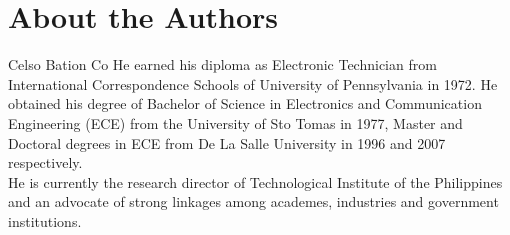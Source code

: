 \documentclass[10pt,journal,compsoc]{IEEEtran} \ifCLASSOPTIONcompsoc
\begin{document}
\noindent  
 
\noindent \section*{About the Authors}
\noindent \begin{IEEEbiography}{Celso Bation Co} He earned his diploma as Electronic Technician from International        Correspondence Schools of University of Pennsylvania in 1972. He obtained        his degree of Bachelor of Science in Electronics and Communication        Engineering (ECE) from the University of Sto Tomas in 1977, Master         and Doctoral degrees in ECE from De La Salle University in 1996 and        2007 respectively. \\ He is currently the research director of Technological Institute of the        Philippines and an advocate of strong linkages among academes, industries        and government institutions.\end{IEEEbiography}\ \ \newline
\end{document}
